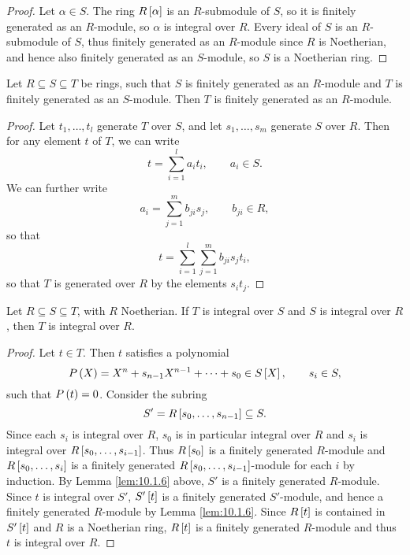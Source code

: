\begin{proof}
Let $ \alpha \in S $. The ring $ R\sbr{\alpha} $ is an $ R $-submodule of $ S $, so it is finitely generated as an $ R $-module, so $ \alpha $ is integral over $ R $. Every ideal of $ S $ is an $ R $-submodule of $ S $, thus finitely generated as an $ R $-module since $ R $ is Noetherian, and hence also finitely generated as an $ S $-module, so $ S $ is a Noetherian ring.
\end{proof}

\pagebreak

\begin{lemma}
\label{lem:10.1.6}
Let $ R \subseteq S \subseteq T $ be rings, such that $ S $ is finitely generated as an $ R $-module and $ T $ is finitely generated as an $ S $-module. Then $ T $ is finitely generated as an $ R $-module.
\end{lemma}

\begin{proof}
Let $ t_1, \dots, t_l $ generate $ T $ over $ S $, and let $ s_1, \dots, s_m $ generate $ S $ over $ R $. Then for any element $ t $ of $ T $, we can write
$$ t = \sum_{i = 1}^l a_it_i, \qquad a_i \in S. $$
We can further write
$$ a_i = \sum_{j = 1}^m b_{ji}s_j, \qquad b_{ji} \in R, $$
so that
$$ t = \sum_{i = 1}^l \sum_{j = 1}^m b_{ji}s_jt_i, $$
so that $ T $ is generated over $ R $ by the elements $ s_it_j $.
\end{proof}

\begin{corollary}
Let $ R \subseteq S \subseteq T $, with $ R $ Noetherian. If $ T $ is integral over $ S $ and $ S $ is integral over $ R $, then $ T $ is integral over $ R $.
\end{corollary}

\begin{proof}
Let $ t \in T $. Then $ t $ satisfies a polynomial
$$ P\br{X} = X^n + s_{n - 1}X^{n - 1} + \dots + s_0 \in S\sbr{X}, \qquad s_i \in S, $$
such that $ P\br{t} = 0 $. Consider the subring
$$ S' = R\sbr{s_0, \dots, s_{n - 1}} \subseteq S. $$
Since each $ s_i $ is integral over $ R $, $ s_0 $ is in particular integral over $ R $ and $ s_i $ is integral over $ R\sbr{s_0, \dots, s_{i - 1}} $. Thus $ R\sbr{s_0} $ is a finitely generated $ R $-module and $ R\sbr{s_0, \dots, s_i} $ is a finitely generated $ R\sbr{s_0, \dots, s_{i - 1}} $-module for each $ i $ by induction. By Lemma \ref{lem:10.1.6} above, $ S' $ is a finitely generated $ R $-module. Since $ t $ is integral over $ S' $, $ S'\sbr{t} $ is a finitely generated $ S' $-module, and hence a finitely generated $ R $-module by Lemma \ref{lem:10.1.6}. Since $ R\sbr{t} $ is contained in $ S'\sbr{t} $ and $ R $ is a Noetherian ring, $ R\sbr{t} $ is a finitely generated $ R $-module and thus $ t $ is integral over $ R $.
\end{proof}

